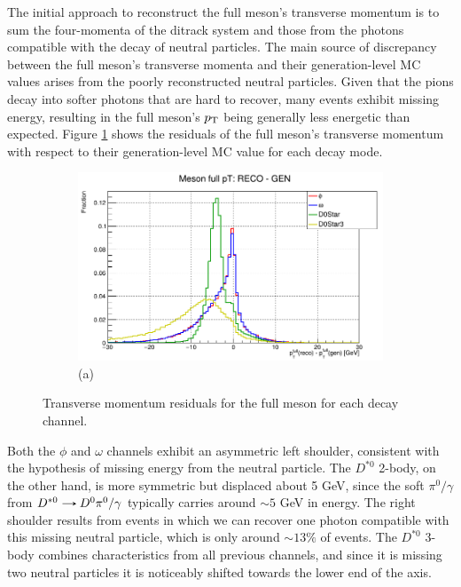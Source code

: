 \begin{myitemlist}
    The initial approach to reconstruct the full meson's transverse momentum is to sum the four-momenta of the ditrack system and those from the photons compatible with the decay of neutral particles. The main source of discrepancy between the full meson's transverse momenta and their generation-level MC values arises from the poorly reconstructed neutral particles. Given that the pions decay into softer photons that are hard to recover, many events exhibit missing energy, resulting in the full meson's $p_\text{T}$ being generally less energetic than expected. Figure \ref{fig:fullmeson_residuals_pt} shows the residuals of the full meson's transverse momentum with respect to their generation-level MC value for each decay mode.
    \begin{figure}[!ht]
        \captionsetup[subfigure]{labelformat=empty}
        \vspace*{-0.2cm}
        \centering
        \setlength{\mylength}{\textwidth}
        \begin{subfigure}[t]{\mylength}
                \centering
                \includegraphics[width=0.75\mylength]{resources/plots/fullmeson_residuals_pt.png}
                \caption{\footnotesize (a)}
        \end{subfigure}%
        \vspace*{-0.0cm}
        \caption{Transverse momentum residuals for the full meson for each decay channel.}
        \label{fig:fullmeson_residuals_pt}
        \vspace*{-0.0cm}
    \end{figure}
    Both the $\phi$ and $\omega$ channels exhibit an asymmetric left shoulder, consistent with the hypothesis of missing energy from the neutral particle. The $D^{*0}$ 2-body, on the other hand, is more symmetric but displaced about 5 GeV, since the soft $\pi^{0}/\gamma$ from $D^{*0}\decaysto D^{0}\pi^{0}/\gamma$ typically carries around $\sim5$ GeV in energy. The right shoulder results from events in which we can recover one photon compatible with this missing neutral particle, which is only around $\sim 13\%$ of events. The $D^{*0}$ 3-body combines characteristics from all previous channels, and since it is missing two neutral particles it is noticeably shifted towards the lower end of the axis.


\end{myitemlist}
